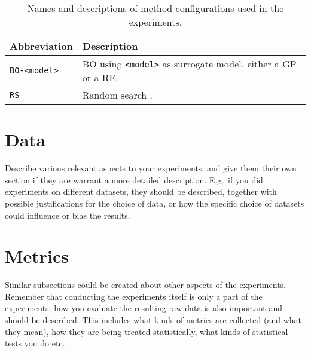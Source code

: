 \begin{table}[H]
\centering
\caption[Names and descriptions of method configurations.]{Names and descriptions of method configurations used in the experiments.}
\begin{tabular}{ll}
\toprule
\textbf{Abbreviation} & \textbf{Description} \\
\midrule
\texttt{BO-<model>} & \Acrshort{BO} using \texttt{<model>} as surrogate model, either a \acrshort{GP} or a \acrshort{RF}. \\
\texttt{RS} & Random search \citep{bergstra2012random}.  \\ 
\bottomrule
\end{tabular}
\label{tab:methods}
\end{table}

\section{Data}\label{sec:data}

Describe various relevant aspects to your experiments, and give them their own section if they are warrant a more detailed description.
E.g.\ if you did experiments on different datasets, they should be described, together with possible justifications for the choice of data, or how the specific choice of datasets could influence or bias the results.

\section{Metrics}\label{sec:metrics}

Similar subsections could be created about other aspects of the experiments.
Remember that conducting the experiments itself is only a part of the experiments; how you evaluate the resulting raw data is also important and should be described.
This includes what kinds of metrics are collected (and what they mean), how they are being treated statistically, what kinds of statistical tests you do etc.
